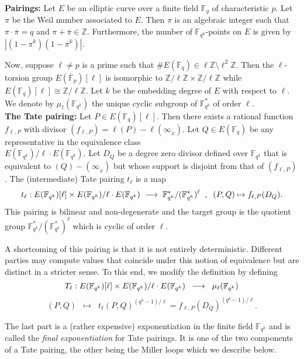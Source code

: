 \documentclass[a4paper, 11pt]{scrreprt}
\numberwithin{equation}{section}
\newcommand{\bF}{\mathbb F}
\newcommand{\bz}{\mathbb Z}
\newcommand{\bFP}{\ov{\mathbb{F}}_p}
\newcommand{\bFq}{\mathbb{F}_q}
\newcommand{\bFqk}{\mathbb{F}_{q^k}}
\newcommand{\lra}{\longrightarrow}
\newcommand{\ov}{\overline}
\newcommand{\vs}{\vspace{-2mm}}
\newcommand{\noin}{\noindent}
\theoremstyle{plain}
\begin{document}
\noin \textbf{Pairings:} Let $E$ be an elliptic curve over a finite field $\bFq$  of characteristic $p$. Let $\pi$ be the Weil number associated to $E$. Then $\pi$ is an algebraic integer such that $\pi\cdot \ov{\pi} = q$ and $\pi+\ov{\pi}\in \bz$. Furthermore, the number of $\bFqk$-points on $E$ is given by $|(1-\pi^k)(1-\ov{\pi}^k)|$.


Now, suppose $\ell\neq p$ is a prime such that $\# E(\bFq)\in \ell\bz\setminus \ell^2\bz$. Then the $\ell$-torsion group $E(\bFP)[\ell]$ is isomorphic to $\bz/\ell\bz \times \bz/\ell\bz$ while $E(\bFq)[\ell]\cong \bz/\ell\bz$. Let $k$ be the embedding degree of $E$ with respect to $\ell$. We denote by $\mu_{\ell}(\bF _{q^k})$ the unique cyclic subgroup of $\bF _{q^k}^*$ of order $\ell$.\\

\noin \textbf{The Tate pairing:} Let $P\in E(\bFq)[\ell]$. Then there exists a rational function $f_{\ell,P}$ with divisor $(f_{\ell,P}) = \ell(P) - \ell(\infty_{_E})$. Let $Q\in E(\bFq)$ be any representative in the equivalence class\\ $E(\bF _ {q^k})/\ell \cdot E(\bF _ {q^k})$. Let $D_Q$ be a degree zero divisor defined over $\bF _ {q^k}$ that is equivalent to $(Q)-(\infty_{_E})$ but whose support is disjoint from that of $(f_{\ell,P})$. The (intermediate) Tate pairing $t_{\ell}$ is a map \vs $$t_{\ell}: E(\bF _ {q^k})[\ell]\times E(\bF _ {q^k})/\ell \cdot E(\bF _ {q^k})\;\lra\; \bF _ {q^k}^*/(\bF _ {q^k}^*)^{\ell}\;\;,\;\;(P,Q)\mapsto f_{\ell,P}(D_Q) \vs .$$ This pairing is bilinear and non-degenerate and the target group is the quotient group $\bF _ {q^k}^*/(\bF _ {q^k}^*)^{\ell}$ which is cyclic of order $\ell$. 

A shortcoming of this pairing is that it is not entirely deterministic. Different parties may compute values that coincide under this notion of equivalence   but are distinct in a stricter sense. To this end, we modify the definition by defining \vs $$T_{\ell} : E(\bF _ {q^k})[\ell]\times E(\bF _ {q^k})/\ell \cdot E(\bF _ {q^k})\;\;\lra\;\; \mu_{\ell}(\bF _ {q^k})\vs $$ \vs $$(P,Q)\;\;\mapsto\;\; t_{\ell}(P,Q)^{(q^k-1)/\ell} = f_{\ell, P}(D_Q)^{(q^k-1)/\ell}. $$  

\noin The last part is a (rather expensive) exponentiation in the finite field $\bF _ {q^k}$ and is called the \textit{final exponentiation} for Tate pairings. It is one of the two components of a Tate pairing, the other being the Miller loops which we describe below. 
\end{document}
